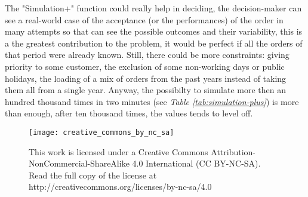 \documentclass[a4paper,12pt]{article}
\begin{document}
The "Simulation+" function could really help in deciding, the decision-maker can see a real-world case of the acceptance (or the performances) of the order in many attempts so that can see the possible outcomes and their variability, this is a the greatest contribution to the problem, it would be perfect if all the orders of that period were already known. Still, there could be more constraints: giving priority to some customer, the exclusion of some non-working days or public holidays, the loading of a mix of orders from the past years instead of taking them all from a single year.  Anyway, the possibilty to simulate more then an hundred thousand times in two minutes (see \textit{Table \ref{tab:simulation-plus}}) is more than enough, after ten thousand times, the values tends to level off.


\newpage
\thispagestyle{empty}
\begin{figure*}[!b]
	\centering
   	 \texttt{[image: creative\_commons\_by\_nc\_sa]}
	\caption*{This work is licensed under a Creative Commons Attribution-NonCommercial-ShareAlike 4.0 International (CC BY-NC-SA).\\Read the full copy of the license at http://creativecommons.org/licenses/by-nc-sa/4.0}
\end{figure*}
\vspace*{\fill}
\end{document}
